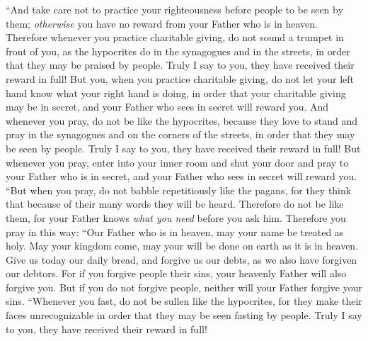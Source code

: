 \begin{biblechapter} %
 “And take care not to practice your righteousness before people to be seen by them; \textit{otherwise} you have no reward from your Father who is in heaven.
\verse Therefore whenever you practice charitable giving, do not sound a trumpet in front of you, as the hypocrites do in the synagogues and in the streets, in order that they may be praised by people. Truly I say to you, they have received their reward in full!
\verse But you, when you practice charitable giving, do not let your left hand know what your right hand is doing,
\verse in order that your charitable giving may be in secret, and your Father who sees in secret will reward you.
 And whenever you pray, do not be like the hypocrites, because they love to stand and pray in the synagogues and on the corners of the streets, in order that they may be seen by people. Truly I say to you, they have received their reward in full!
\verse But whenever you pray, enter into your inner room and shut your door and pray to your Father who is in secret, and your Father who sees in secret will reward you.
\verse “But when you pray, do not babble repetitiously like the pagans, for they think that because of their many words they will be heard.
\verse Therefore do not be like them, for your Father knows \textit{what you need} before you ask him.
\verse Therefore you pray in this way:
\verse “Our Father who is in heaven, 
may your name be treated as holy.
\verse May your kingdom come, 
may your will be done 
on earth as it is in heaven.
\verse Give us today our daily bread,
\verse and forgive us our debts, 
as we also have forgiven our debtors.
\verse For if you forgive people their sins, your heavenly Father will also forgive you.
\verse But if you do not forgive people, neither will your Father forgive your sins.
 “Whenever you fast, do not be sullen like the hypocrites, for they make their faces unrecognizable in order that they may be seen fasting by people. Truly I say to you, they have received their reward in full!

\end{biblechapter}
